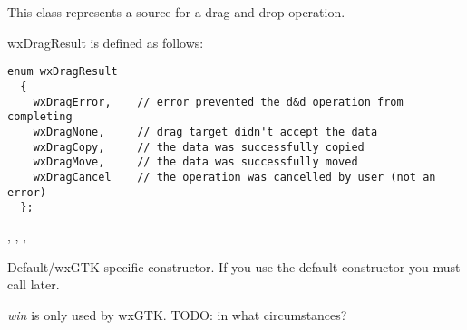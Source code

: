 \section{}\label{wxdropsource}


This class represents a source for a drag and drop operation.




wxDragResult is defined as follows:

{\small\begin{verbatim}
enum wxDragResult
  {
    wxDragError,    // error prevented the d&d operation from completing
    wxDragNone,     // drag target didn't accept the data
    wxDragCopy,     // the data was successfully copied
    wxDragMove,     // the data was successfully moved
    wxDragCancel    // the operation was cancelled by user (not an error)
  };
\end{verbatim}%
}


, , 
, 


\label{wxdropsourcewxdropsource}


Default/wxGTK-specific constructor. If you use the default constructor you must
call  later.

{\it win} is only used by wxGTK. TODO: in what circumstances?





\label{wxdropsourcedtor}

